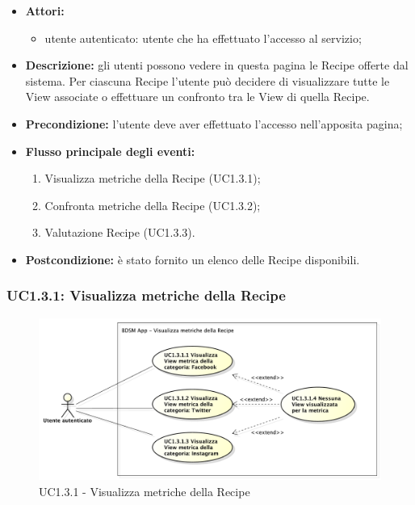 \begin{itemize}
	\item \textbf{Attori:}
	\begin{itemize}
		\item utente autenticato: utente che ha effettuato l'accesso al servizio;
	\end{itemize}
	\item \textbf{Descrizione:} gli utenti possono vedere in questa pagina le Recipe offerte dal sistema. Per ciascuna Recipe l'utente può decidere di visualizzare tutte le View associate o effettuare un confronto tra le View di quella Recipe.
	\item \textbf{Precondizione:} l'utente deve aver effettuato l'accesso nell'apposita pagina;
	\item \textbf{Flusso principale degli eventi:}
	\begin{enumerate}
		\item Visualizza metriche della Recipe (UC1.3.1);
		\item Confronta metriche della Recipe (UC1.3.2);
		\item Valutazione Recipe (UC1.3.3).
	\end{enumerate}
	\item \textbf{Postcondizione:} è stato fornito un elenco delle Recipe disponibili.
\end{itemize}

\subsubsection{UC1.3.1: Visualizza metriche della Recipe}
\begin{figure}[!htbp]
	\centering
	\centerline{\includegraphics[scale=0.45]{./images/UC1_3_1.pdf}}
	\caption{UC1.3.1 - Visualizza metriche della Recipe}
\end{figure}

